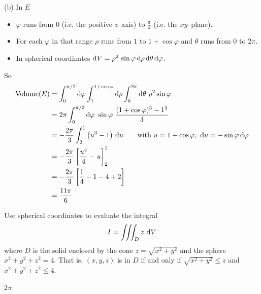 \begin{solution}
(b) In $E$
\begin{itemize}
\item
$\varphi$ runs from $0$ (i.e. the positive $z$--axis) to $\frac{\pi}{2}$
(i.e. the $xy$--plane).
\item
For each $\varphi$ in that range $\rho$ runs from $1$ to 
$1+\cos\varphi$ and $\theta$ runs from $0$ to $2\pi$.
\item
In spherical coordinates $\mathrm{d}V = \rho^2\,\sin\varphi\,\mathrm{d}\rho\,
     \mathrm{d}\theta\,\mathrm{d}\varphi$.
\end{itemize}
So
\begin{align*}
\text{Volume}(E)
&=\int_0^{\pi/2}\dee{\varphi} \int_1^{1+\cos\varphi}\dee{\rho}
\int_0^{2\pi}\dee{\theta}\ \rho^2\sin\varphi \\
&=2\pi \int_0^{\pi/2}\dee{\varphi}\ \sin\varphi\ 
        \frac{(1+\cos\varphi)^3-1^3}{3} \\
&=-\frac{2\pi}{3} \int_2^1 \big(u^3-1\big)\ \dee{u}
\qquad\text{with }u=1+\cos\varphi,\ \dee{u}=-\sin\varphi\,\dee{\varphi} \\
&= -\frac{2\pi}{3}\left[\frac{u^4}{4}-u\right]_2^1 \\
&=-\frac{2\pi}{3} \left[\frac{1}{4}-1-4+2\right] \\
&=\frac{11 \pi}{6}
\end{align*}
\end{solution}


\begin{question}[M200 2006D] %
Use spherical coordinates to evaluate the integral
\begin{equation*}
I=\iiint_D z\ \mathrm{d}V
\end{equation*}
where $D$ is the solid enclosed by the cone $z = \sqrt{x^2 + y^2}$
and the sphere $x^2 + y^2 + z^2 = 4$. That is, $(x,y,z)$ is in $D$ if and only if $\sqrt{x^2 + y^2}\le z$ and $x^2 + y^2 + z^2 \le 4$.
\end{question}

%

\begin{answer}
$2\pi$
\end{answer}

